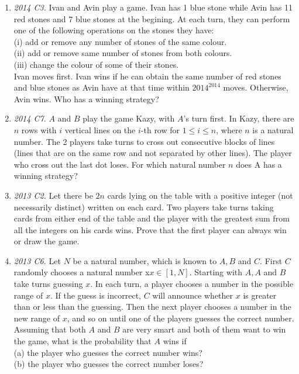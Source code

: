 \documentclass[11pt,a4paper]{article}
\begin{document}
\begin{enumerate}
\item\emph {2014 C3.} Ivan and Avin play a game. Ivan has 1 blue stone while Avin has 11 red stones and 7 blue stones at the
begining. At each turn, they can perform one of the following operations on the stones they have:\\
(i) add or remove any number of stones of the same colour.\\
(ii) add or remove same number of stones from both colours.\\
(iii) change the colour of some of their stones.\\
Ivan moves first. Ivan wins if he can obtain the same number of red stones and blue stones as Avin have
at that time within $2014^{2014}$ moves. Otherwise, Avin wins. Who has a winning strategy?

\item\emph {2014 C7.} $A$ and $B$ play the game Kazy, with $A$'s turn first. In Kazy, there are $n$ rows with $i$ vertical lines on the $i$-th row for $1\le  i\le  n$, where $n$ is a natural number. The 2 players take turns to cross out consecutive
blocks of lines (lines that are on the same row and not separated by other lines). The player who cross
out the last dot loses. For which natural number $n$ does A has a winning strategy?

\item\emph {2013 C2.} Let there be $2n$ cards lying on the table with a positive integer (not necessarily distinct) written on each
card. Two players take turns taking cards from either end of the table and the player with the greatest
sum from all the integers on his cards wins. Prove that the first player can always win or draw the game.

\item\emph {2013 C6.} Let $N$ be a natural number, which is known to $A, B$ and $C$. First $C$ randomly chooses a natural number
x$x\in [1,N]$. Starting with $A, A$ and $B$ take turns guessing $x$. In each turn, a player chooses a number
in the possible range of $x$. If the guess is incorrect, $C$ will announce whether $x$ is greater than or less
than the guessing. Then the next player chooses a number in the new range of $x$, and so on until one of
the players guesses the correct number. Assuming that both $A$ and $B$ are very smart and both of them
want to win the game, what is the probability that $A$ wins if\\
(a) the player who guesses the correct number wins?\\
(b) the player who guesses the correct number loses?
\end{enumerate}
\end{document}
